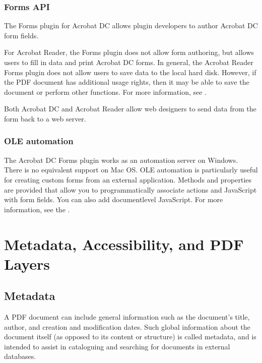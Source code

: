 \documentclass[letterpaper,12pt,english,openany,oneside]{sphinxmanual}
\begin{document}
\subsection{Forms API}
\label{\detokenize{Overview_Forms:forms-api}}
The Forms plug\sphinxhyphen{}in for Acrobat DC allows plug\sphinxhyphen{}in developers to author Acrobat DC form fields.

For Acrobat Reader, the Forms plug\sphinxhyphen{}in does not allow form authoring, but allows users to fill in data and print Acrobat DC forms. In general, the Acrobat Reader Forms plug\sphinxhyphen{}in does not allow users to save data to the local hard disk. However, if the PDF document has additional usage rights, then it may be able to save the document or perform other functions. For more information, see .

Both Acrobat DC and Acrobat Reader allow web designers to send data from the form back to a web server.


\subsection{OLE automation}
\label{\detokenize{Overview_Forms:ole-automation}}
The Acrobat DC Forms plug\sphinxhyphen{}in works as an automation server on Windows. There is no equivalent support on Mac OS. OLE automation is particularly useful for creating custom forms from an external application. Methods and properties are provided that allow you to programmatically associate actions and JavaScript with form fields. You can also add document\sphinxhyphen{}level JavaScript. For more information, see the  .


\chapter{Metadata, Accessibility, and PDF Layers}
\label{\detokenize{Overview_Metadata:metadata-accessibility-and-pdf-layers}}\label{\detokenize{Overview_Metadata::doc}}

\section{Metadata}
\label{\detokenize{Overview_Metadata:metadata}}
A PDF document can include general information such as the document’s title, author, and creation and modification dates. Such global information about the document itself (as opposed to its content or structure) is called metadata, and is intended to assist in cataloguing and searching for documents in external databases.
\end{document}
